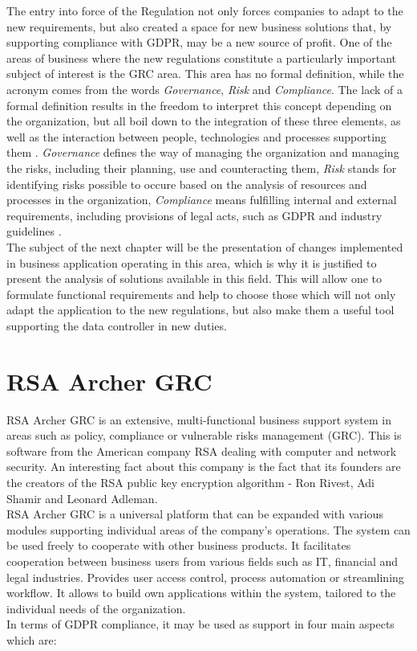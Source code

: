 \documentclass[en, noamssymb]{mgr}
\begin{document}
The entry into force of the Regulation not only forces companies to adapt to the new requirements, but also created a space for new business solutions that, by supporting compliance with GDPR, may be a new source of profit. One of the areas of business where the new regulations constitute a particularly important subject of interest is the GRC area. This area has no formal definition, while the acronym comes from the words \textit{Governance}, \textit{Risk} and \textit{Compliance}. The lack of a formal definition results in the freedom to interpret this concept depending on the organization, but all boil down to the integration of these three elements, as well as the interaction between people, technologies and processes supporting them \cite{grc_2017}. \textit{Governance} defines the way of managing the organization and managing the risks, including their planning, use and counteracting them, \textit{Risk} stands for identifying risks possible to occure based on the analysis of resources and processes in the organization, \textit{Compliance} means fulfilling internal and external requirements, including provisions of legal acts, such as GDPR and industry guidelines \cite{grc_2017}.\\
\indent The subject of the next chapter will be the presentation of changes implemented in business application operating in this area, which is why it is justified to present the analysis of solutions available in this field. This will allow one to formulate functional requirements and help to choose those which will not only adapt the application to the new regulations, but also make them a useful tool supporting the data controller in new duties.

\section{RSA Archer GRC}

RSA Archer GRC is an extensive, multi-functional business support system in areas such as policy, compliance or vulnerable risks management (GRC). This is software from the American company RSA dealing with computer and network security. An interesting fact about this company is the fact that its founders are the creators of the RSA public key encryption algorithm - Ron Rivest, Adi Shamir and Leonard Adleman. \\
\indent RSA Archer GRC is a universal platform that can be expanded with various modules supporting individual areas of the company's operations. The system can be used freely to cooperate with other business products. It facilitates cooperation between business users from various fields such as IT, financial and legal industries. Provides user access control, process automation or streamlining workflow. It allows to build own applications within the system, tailored to the individual needs of the organization.\\
\indent In terms of GDPR compliance, it may be used as support in four main aspects which are:
\end{document}

